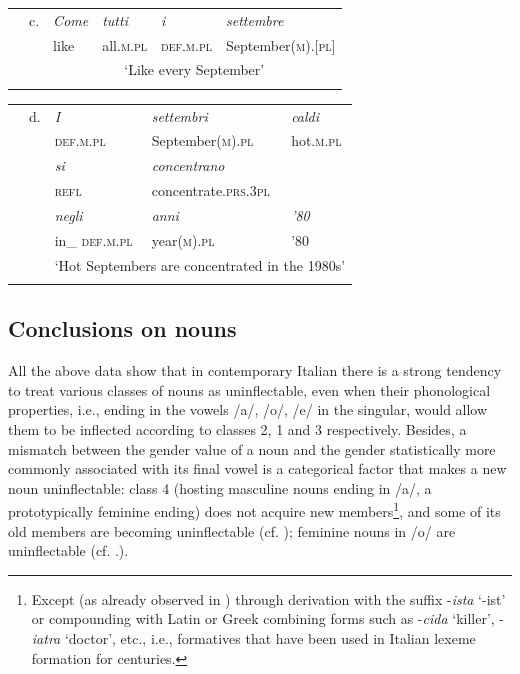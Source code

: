 \documentclass[output=paper]{langscibook}
\begin{document}
\begin{tabularx}{\textwidth}{XXXXXX}
 & c. & \textit{Come}  & \textit{tutti} & \textit{i} & \textit{settembre}\\
\lsptoprule
&  & like & all.\textsc{m.pl} & \textsc{def.m.pl} & September(\textsc{m}).[\textsc{pl}]\\
&  & \multicolumn{4}{c}{‘Like every September’}\\
\lspbottomrule
\end{tabularx}

\begin{tabularx}{\textwidth}{XXXXX}
 & d. & \textit{I} & \textit{settembri} & \textit{caldi}\\
\lsptoprule
&  & \textsc{def.m.pl} & September\textsc{(m).pl} & hot.\textsc{m.pl}\\
&  & \textit{si}  & \textit{concentrano} & \\
&  & \textsc{refl} & concentrate.\textsc{prs.3pl} & \\
&  & \textit{negli}  & \textit{anni} & \textit{’80}\\
&  & in\_ \textsc{def.m.pl} & year(\textsc{m).pl} & ’80\\
&  & \multicolumn{3}{c}{‘Hot Septembers are concentrated in the 1980s’}\\
\lspbottomrule
\end{tabularx}
\subsection{Conclusions on nouns}

All the above data show that in contemporary Italian there is a strong tendency to treat various classes of nouns as uninflectable, even when their phonological properties, i.e., ending in the vowels /a/, /o/, /e/ in the singular, would allow them to be inflected according to classes 2, 1 and 3 respectively. Besides, a mismatch between the gender value of a noun and the gender statistically more commonly associated with its final vowel is a categorical factor that makes a new noun uninflectable: class 4 (hosting masculine nouns ending in /a/, a prototypically feminine ending) does not acquire new members\footnote{Except (as already observed in ) through derivation with the suffix \nobreakdash-\textit{ista} ‘\nobreakdash-ist’ or compounding with Latin or Greek combining forms such as \nobreakdash-\textit{cida} ‘killer’, \nobreakdash-\textit{iatra} ‘doctor’, etc., i.e., formatives that have been used in Italian lexeme formation for centuries.}, and some of its old members are becoming uninflectable (cf. ); feminine nouns in /o/ are uninflectable (cf. .).
\end{document}
